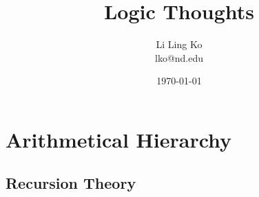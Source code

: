 \documentclass{article}
\begin{document}
\title{Logic Thoughts}
\author{Li Ling Ko\\ lko@nd.edu}
\date{\today}
\maketitle

\section{Arithmetical Hierarchy}
%    
  \subsection{Recursion Theory}
    
%    
%    
%    
\end{document}
